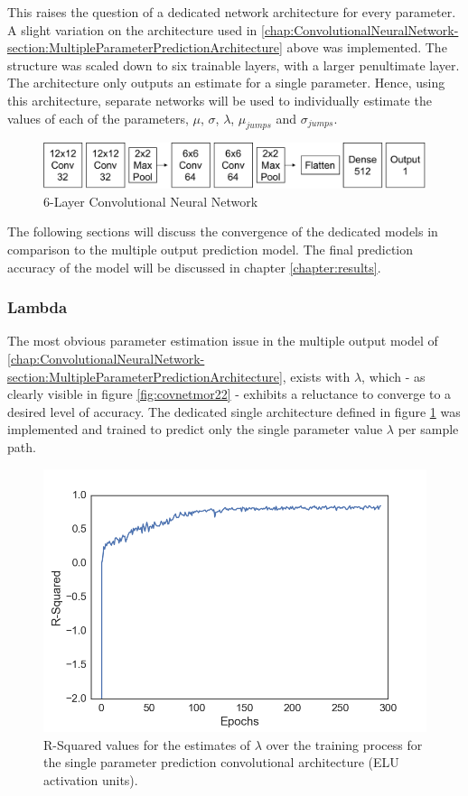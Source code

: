 \documentclass[11pt,oneside,openany,a4paper,english, report, goldenblock
]{usthesis}
\begin{document}
This raises the question of a dedicated network architecture for every parameter. A slight variation on the architecture used in \ref{chap:ConvolutionalNeuralNetwork-section:MultipleParameterPredictionArchitecture} above was implemented. The structure was scaled down to six trainable layers, with a larger penultimate layer. The architecture only outputs an estimate for a single parameter. Hence, using this architecture, separate networks will be used to individually estimate the values of each of the parameters, $\mu$, $\sigma$, $\lambda$, $\mu_{jumps}$ and $\sigma_{jumps}$.

\begin{figure}[h]
	\centering
	\includegraphics[width=0.75\linewidth]{Images/Diagrams/Network-Structures/SingleParameterDedicatedCNN}
	\caption[Dedicated Single Parameter Prediction CNN]{6-Layer Convolutional Neural Network}
	\label{fig:singleparameterdedicatedcnn}
\end{figure}

The following sections will discuss the convergence of the dedicated models in comparison to the multiple output prediction model. The final prediction accuracy of the model will be discussed in chapter \ref{chapter:results}.

\subsubsection{Lambda}

The most obvious parameter estimation issue in the multiple output model of \ref{chap:ConvolutionalNeuralNetwork-section:MultipleParameterPredictionArchitecture}, exists with $\lambda$, which - as clearly visible in figure \ref{fig:covnetmor22} - exhibits a reluctance to converge to a desired level of accuracy. The dedicated single architecture defined in figure \ref{fig:singleparameterdedicatedcnn} was implemented and trained to predict only the single parameter value $\lambda$ per sample path. 

\begin{figure}[h]
	\centering
	\includegraphics[width=0.5\linewidth]{Images/Prediction-Convergence/ConvolutionalNN-SingleOutput/Lambda-RSquared}
	\caption[R-Squared values for the predictions of $\lambda$ over the training process for the single parameter prediction convolutional architecture (ELU activation units).]{R-Squared values for the estimates of $\lambda$ over the training process for the single parameter prediction convolutional architecture (ELU activation units).}
	\label{fig:lambda-rsquared}
\end{figure}
\end{document}
